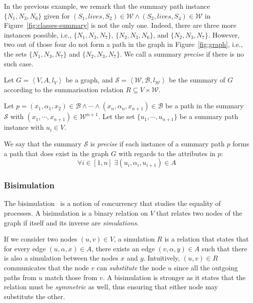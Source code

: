 In the previous example, we remark that the summary path instance $\{N_1, N_3, N_6\}$ given for $(S_1, lives, S_2) \in \mathcal{W} \wedge (S_2, lives, S_4) \in \mathcal{W}$ in Figure~\ref{fig:classes-summary} is not the only one. Indeed, there are three more instances possible, i.e., $\{N_1, N_3, N_7\}$, $\{N_2, N_3, N_6\}$, and $\{N_2, N_3, N_7\}$. However, two out of those four do not form a path in the graph in Figure~\ref{fig:graph}, i.e., the sets $\{N_1, N_3, N_7\}$ and $\{N_2, N_3, N_7\}$. We call a summary \emph{precise} if there is no such case.

\begin{definition}
\label{def:precise-summary}
Let $G=\left\langle V, A, l_V \right\rangle$ be a graph, and $\mathcal{S} = \left\langle \mathcal{W}, \mathcal{B}, l_{\mathcal{W}} \right\rangle$ be the summary of $G$ according to the summarisation relation $R \subseteq V \times \mathcal{W}$.

Let $p = (x_1, \alpha_1, x_2) \in \mathcal{B} \wedge \cdots \wedge (x_n, \alpha_n, x_{n+1}) \in \mathcal{B}$ be a path in the summary $\mathcal{S}$ with $(x_1, \cdots, x_{n+1}) \in \mathcal{W}^{n+1}$. Let the set $\{ u_1, \cdots, u_{n+1} \}$ be a summary path instance with $u_i \in V$.

We say that the summary $\mathcal{S}$ is \emph{precise} if each instance of a summary path $p$ forms a path that does exist in the graph $G$ with regards to the attributes in $p$:
$$
\forall i \in [1, n ]\; \exists \left(u_i, \alpha_i, u_{i+1} \right) \in A
$$
\end{definition}

\subsubsection{Bisimulation}
\label{chap:summary:bisim}

The bisimulation~\cite{park:1981:cai} is a notion of concurrency that studies the equality of processes.
A bisimulation is a binary relation on $V$ that relates two nodes of the graph if itself and its inverse are \emph{simulations}.

If we consider two nodes $(u, v) \in V$, a simulation $R$ is a relation that states that for every edge $(u, \alpha, x) \in A$, there exists an edge $(v,\alpha, y) \in A$ such that there is also a simulation between the nodes $x$ and $y$. Intuitively, $(u,v) \in R$ communicates that the node $v$ can \emph{substitute} the node $u$ since all the outgoing paths from $u$ match those from $v$. A bisimulation is stronger as it states that the relation must be \emph{symmetric} as well, thus ensuring that either node may substitute the other.

